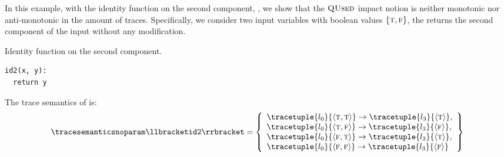 \begin{example}
In this example, with the identity function on the second component, \cf{} , we show that the $\textup{\textsc{QUsed}}$ impact notion is neither monotonic nor anti-monotonic in the amount of traces.
Specifically, we consider two input variables with boolean values $\{\textsc{t}, \textsc{f}\}$, the  returns the second component of the input without any modification.
\begin{marginlisting}
  \caption{Identity function on the second component.}
  \vspace{25pt}
\begin{lstlisting}[language=customPython]
id2(x, y):
  return y
 \end{lstlisting}
\end{marginlisting}
The trace semantics of  is:
\begin{align*}
  \tracesemanticsnoparam\semanticsof{\texttt{id2}}
  =
  \left\{
    \begin{array}{l}
      \tracetuple{\locinit}{\langle \true, \true\rangle}\rightarrow\tracetuple{\loc{3}}{\langle \true\rangle}, \\
      \tracetuple{\locinit}{\langle \true, \false\rangle}\rightarrow\tracetuple{\loc{3}}{\langle \false\rangle}, \\
      \tracetuple{\locinit}{\langle \false, \true\rangle}\rightarrow\tracetuple{\loc{3}}{\langle \true\rangle}, \\
      \tracetuple{\locinit}{\langle \false, \false\rangle}\rightarrow\tracetuple{\loc{3}}{\langle \false\rangle}
    \end{array}
    \right\}
\end{align*}
\begin{marginfigure}
\end{marginfigure}
\end{example}
